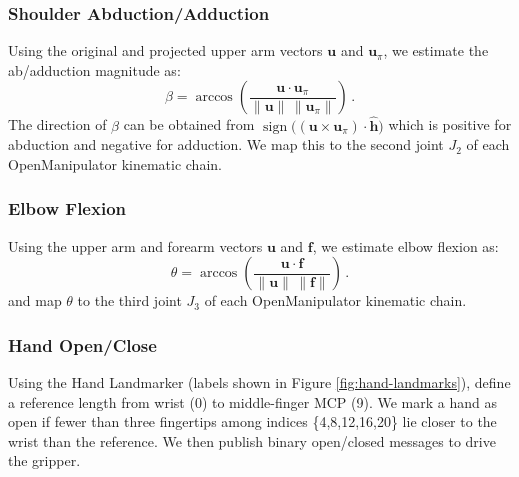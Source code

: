 \documentclass[acmsmall, screen]{acmart}
\begin{document}
\subsubsection{Shoulder Abduction/Adduction}
Using the original and projected upper arm vectors $\mathbf{u}$ and $\mathbf{u}_\pi$, we estimate the ab/adduction magnitude as:
\begin{equation}
\beta=\arccos \!\left( \frac{\mathbf{u}\cdot\mathbf{u}_\pi}{\lVert\mathbf{u}\rVert\, \lVert\mathbf{u}_\pi\rVert} \right)\,.
\end{equation}
The direction of $\beta$ can be obtained from $\operatorname{sign}\big((\mathbf{u}\times\mathbf{u}_\pi)\cdot\hat{\mathbf{h}}\big)$ which is positive for abduction and negative for adduction. We map this to the second joint $J_2$ of each OpenManipulator kinematic chain.

\subsubsection{Elbow Flexion}
Using the upper arm and forearm vectors $\mathbf{u}$ and $\mathbf{f}$, we estimate elbow flexion as:
\begin{equation}
\theta=\arccos \!\left( \frac{\mathbf{u}\cdot\mathbf{f}}{\lVert\mathbf{u}\rVert\, \lVert\mathbf{f}\rVert} \right)\,.
\end{equation}
and map $\theta$ to the third joint $J_3$ of each OpenManipulator kinematic chain.

\subsubsection{Hand Open/Close}
Using the Hand Landmarker (labels shown in Figure \ref{fig:hand-landmarks}), define a reference length from wrist (0) to middle-finger MCP (9). We mark a hand as open if fewer than three fingertips among indices \{4,8,12,16,20\} lie closer to the wrist than the reference. We then publish binary open/closed messages to drive the gripper.
\end{document}
